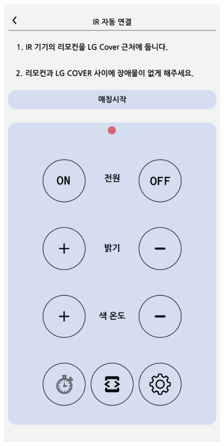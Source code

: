 \documentclass[conference]{IEEEtran}
\begin{document}
\begin{enumerate}[label=\arabic*.]
\begin{enumerate}[label=\alph*.]
\begin{itemize}
\begin{figure}[H]\centering \includegraphics[scale=0.4]{images/sw-spec-17.png}\end{figure}

\end{itemize}
\end{enumerate}
\end{enumerate}
\end{document}
